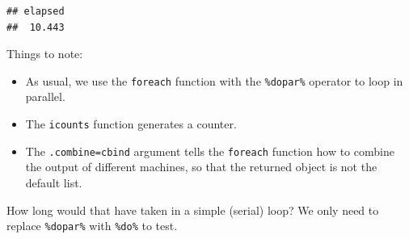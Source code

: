 \documentclass[]{book}
\newenvironment{Shaded}{\begin{snugshade}}{\end{snugshade}}
\newcommand{\DataTypeTok}[1]{\textcolor[rgb]{0.13,0.29,0.53}{#1}}
\newcommand{\DecValTok}[1]{\textcolor[rgb]{0.00,0.00,0.81}{#1}}
\newcommand{\FloatTok}[1]{\textcolor[rgb]{0.00,0.00,0.81}{#1}}
\newcommand{\KeywordTok}[1]{\textcolor[rgb]{0.13,0.29,0.53}{\textbf{#1}}}
\newcommand{\NormalTok}[1]{#1}
\newcommand{\OperatorTok}[1]{\textcolor[rgb]{0.81,0.36,0.00}{\textbf{#1}}}
\newcommand{\OtherTok}[1]{\textcolor[rgb]{0.56,0.35,0.01}{#1}}
\newcommand{\StringTok}[1]{\textcolor[rgb]{0.31,0.60,0.02}{#1}}
\providecommand{\tightlist}{%
  \setlength{\itemsep}{0pt}\setlength{\parskip}{0pt}}
\theoremstyle{definition}
\theoremstyle{definition}
\theoremstyle{definition}
\theoremstyle{remark}
\begin{document}
\begin{Shaded}
\end{Shaded}

\begin{verbatim}
## elapsed 
##  10.443
\end{verbatim}

Things to note:

\begin{itemize}
\tightlist
\item
  As usual, we use the \texttt{foreach} function with the \texttt{\%dopar\%} operator to loop in parallel.
\item
  The \texttt{icounts} function generates a counter.
\item
  The \texttt{.combine=cbind} argument tells the \texttt{foreach} function how to combine the output of different machines, so that the returned object is not the default list.
\end{itemize}

How long would that have taken in a simple (serial) loop?
We only need to replace \texttt{\%dopar\%} with \texttt{\%do\%} to test.
\end{document}
